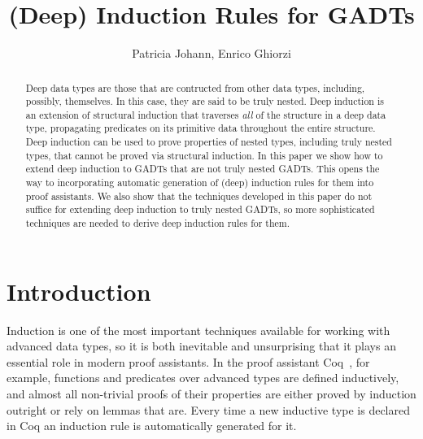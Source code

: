 \documentclass[sigplan,10pt,anonymous,review]{acmart}
\begin{document}
\title[(Deep) Induction Rules for GADTs]{(Deep) Induction Rules for GADTs}
  \author{Patricia Johann, Enrico Ghiorzi}

    
\begin{abstract} 
  Deep data types are those that are contructed from other data types,
  including, possibly, themselves.  In this case, they are said to be
  truly nested.  Deep induction is an extension of structural
  induction that traverses {\em all} of the structure in a deep data
  type, propagating predicates on its primitive data throughout the
  entire structure.  Deep induction can be used to prove properties of
  nested types, including truly nested types, that cannot be proved
  via structural induction.  In this paper we show how to extend deep
  induction to GADTs that are not truly nested GADTs.  {\color{red}
    This opens the way to incorporating automatic generation of (deep)
    induction rules for them into proof assistants.}  We also show
  that the techniques developed in this paper do not suffice for
  extending deep induction to truly nested GADTs, {\color{red} so more
    sophisticated techniques are needed to derive deep induction rules
    for them.}
\end{abstract}

\maketitle

\vspace*{-0.1in}

\section{Introduction}\label{sec:intro}

Induction is one of the most important techniques available for
working with advanced data types, so it is both inevitable and
unsurprising that it plays an essential role in modern proof
assistants. In the proof assistant Coq~\cite{coq20}, for example,
functions and predicates over advanced types are defined inductively,
and almost all non-trivial proofs of their properties are either
proved by induction outright or rely on lemmas that are.  Every time a
new inductive type is declared in Coq an induction rule is
automatically generated for it.
\end{document}

